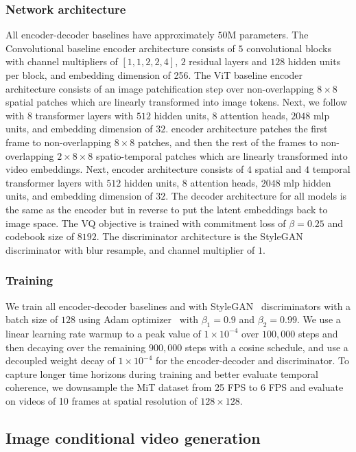 \subsubsection{Network architecture}
All encoder-decoder baselines have approximately $50\text{M}$ parameters.
The Convolutional baseline encoder architecture consists of $5$ convolutional blocks with channel multipliers of $[1, 1, 2, 2, 4]$, $2$ residual layers and $128$ hidden units per block, and embedding dimension of 256.
The ViT baseline encoder architecture consists of an image patchification step over non-overlapping $8\times8$ spatial patches which are linearly transformed into image tokens.
Next, we follow with $8$ transformer layers with $512$ hidden units, $8$ attention heads, $2048$ mlp units, and embedding dimension of $32$.
\cvivit encoder architecture patches the first frame to non-overlapping $8\times8$ patches, and then the rest of the frames to non-overlapping $2\times8\times8$ spatio-temporal patches which are linearly transformed into video embeddings.
Next, \cvivit encoder architecture consists of $4$ spatial and $4$ temporal transformer layers with $512$ hidden units, $8$ attention heads, $2048$ mlp hidden units, and embedding dimension of $32$.
The decoder architecture for all models is the same as the encoder but in reverse to put the latent embeddings back to image space.
The VQ objective is trained with commitment loss of $\beta=0.25$ and codebook size of $8192$.
The discriminator architecture is the StyleGAN \cite{stylegan} discriminator with blur resample, and channel multiplier of $1$.


\subsubsection{Training}
We train all encoder-decoder baselines and with StyleGAN~\citep{stylegan} discriminators with a batch size of $128$ using Adam optimizer~\cite{adam} with $\beta_1=0.9$ and $\beta_2=0.99$. We use a linear learning rate warmup to a peak value of $1 \times 10^{-4}$ over $100,000$ steps and then decaying over the remaining $900,000$ steps with a cosine schedule, and use a decoupled weight decay \cite{adamw} of $1 \times 10^{-4}$ for the encoder-decoder and discriminator. To capture longer time horizons during training and better evaluate temporal coherence, we downsample the MiT dataset from 25 FPS to 6 FPS and evaluate on videos of 10 frames at spatial resolution of $128\times128$.

\subsection{Image conditional video generation}
\label{app:sec:vid_bair}


